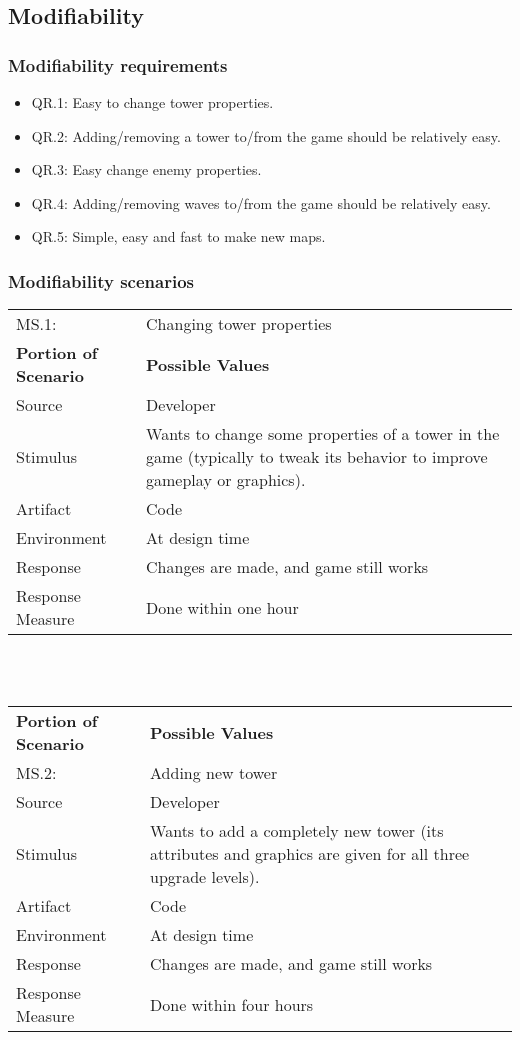 \documentclass[11pt,a4paper]{article}
\begin{document}
\subsection{Modifiability}

\subsubsection{Modifiability requirements}
\begin{itemize}
\item QR.1: Easy to change tower properties.
\item QR.2: Adding/removing a tower to/from the game should be relatively easy.
\item QR.3: Easy change enemy properties.
\item QR.4: Adding/removing waves to/from the game should be relatively easy.
\item QR.5: Simple, easy and fast to make new maps.
\end{itemize}

\subsubsection{Modifiability scenarios}

\begin{tabular}{ l p{7cm} }
\hline
MS.1: & Changing tower properties\\
\textbf{Portion of Scenario} & \textbf{Possible Values} \\
\hline
Source & Developer \\
Stimulus & Wants to change some properties of a tower in the game (typically to tweak its behavior to improve gameplay or graphics). \\
Artifact & Code \\
Environment & At design time \\
Response & Changes are made, and game still works \\
Response Measure & Done within one hour \\
\hline 
\end{tabular}

~\\\\

\noindent \begin{tabular}{ l p{7cm} }
\hline
\textbf{Portion of Scenario} & \textbf{Possible Values} \\
MS.2: & Adding new tower \\
\hline
Source & Developer  \\
Stimulus & Wants to add a completely new tower (its attributes and graphics are given for all three upgrade levels). \\
Artifact & Code \\
Environment & At design time \\
Response & Changes are made, and game still works \\
Response Measure & Done within four hours \\
\hline 
\end{tabular}
\end{document}

